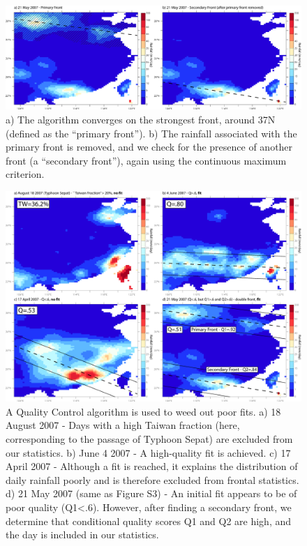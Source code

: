\documentclass[draft,grl]{agutexSI}
\begin{document}
\begin{article}
\begin{figure}
\noindent\includegraphics[width=36pc]{Figures/S3}
\caption{a) The algorithm converges on the strongest front, around 37N (defined as the ``primary front''). b) The rainfall associated with the primary front is removed, and we check for the presence of another front (a ``secondary front''), again using the continuous maximum criterion.}
\end{figure}

\begin{figure}

\noindent\includegraphics[width=36pc]{Figures/S4}
\caption{A Quality Control algorithm is used to weed out poor fits. a) 18 August 2007 - Days with a high Taiwan fraction (here, corresponding to the passage of Typhoon Sepat) are excluded from our statistics. b) June 4 2007 - A high-quality fit is achieved. c) 17 April 2007 - Although a fit is reached, it explains the distribution of daily rainfall poorly and is therefore excluded from frontal statistics. d) 21 May 2007 (same as Figure S3) - An initial fit appears to be of poor quality (Q1<.6). However, after finding a secondary front, we determine that conditional quality scores Q1 and Q2 are high, and the day is included in our statistics.}
\end{figure}


\end{article}
\end{document}

